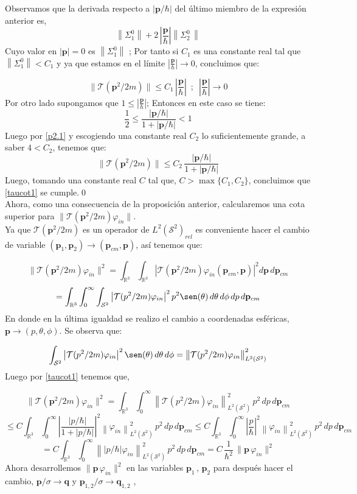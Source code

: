 \documentclass[12pt]{book}
\numberwithin{equation}{chapter}
\def\v{\mathbf}
\def\n{\noindent}
\def\R{\mathbb{R}}
\def\S{\mathcal{S}}
\def\T{\mathcal{T}}
\def\vp{\varphi}
\def\P{\mathbf{p}}
\begin{document}
\n Observamos que la derivada respecto a $|\P/\hbar|$ del \'ultimo miembro de la expresi\'on anterior es,
$$ \left\|  \Sigma_{1}^{0} \right\|+ 2 \, \left| \frac{\P}{\hbar} \right| \left\|   \Sigma_{2}^{0}  \, \right\| $$
Cuyo valor en $|\P|=0$ es $\left\|  \Sigma_{1}^{0} \right\|$ ; Por tanto si $C_{1}$ es una constante real tal que $\left\|  \Sigma_{1}^{0} \right\| < C_{1}$ y ya que estamos en el l\'imite $\left| \frac{\P}{\hbar} \right| \rightarrow 0 $, concluimos que:

\begin{equation}
\| \T ( \P^{2}/2m ) \| \leq C_{1}\, \left| \frac{\P}{\hbar} \right| \,\,\,;\,\,\, \left| \frac{\P}{\hbar} \right| \rightarrow 0
\end{equation}
Por otro lado supongamos que $1 \leq \left| \frac{\P}{\hbar} \right|$; Entonces en este caso se tiene:
$$ \frac{1}{2} \leq \frac{ |\P/\hbar| }{1+|\P/\hbar|} < 1 $$
Luego por \eqref{p2.1} y escogiendo una constante real $C_{2}$ lo suficientemente grande, a saber $4<C_{2}$, tenemos que:
$$ \| \T(\P^{2}/2m) \| \leq C_{2}\, \frac{ |\P/\hbar| }{1+|\P/\hbar|}  $$
Luego, tomando una constante real $C$ tal que, $C > \max \{ C_{1},C_{2} \}$, concluimos que \eqref{taucot1} se cumple.\qed \\

Ahora, como una consecuencia de la proposici\'on anterior, calcularemos una cota superior para $\| \T(\P^{2}/2m) \vp_{in}  \|$.\\

\n Ya que $ \T(\P^{2}/2m) $ es un operador de $L^{2}(\S^{2})_{rel}$ es conveniente hacer el cambio de variable $ ( \P_{1},\P_{2} ) \rightarrow ( \P_{cm},\P ) $, as\'i tenemos que:

$$ \| \T(\P^{2}/2m) \vp_{in}  \|^{2} = \int_{\R^{3}} \int_{\R^{3}} \left|\T(\P^{2}/2m) \vp_{in}( \P_{cm},\P ) \right|^{2} d\P\, d\P_{cm}$$
$$ = \int_{\R^{3}} \int_{0}^{\infty} \int_{\S^{2}} \left|\T(p^{2}/2m) \vp_{in} \right|^{2} p^{2} \sen (\theta) \, d\theta \, d \phi \, dp \, d\P_{cm} $$
En donde en la \'ultima igualdad se realizo el cambio a coordenadas esf\'ericas, $ \P \rightarrow (p,\theta , \phi ) $. Se observa que:

$$ \int_{\S^{2}} \left|\T(p^{2}/2m) \vp_{in} \right|^{2} \sen (\theta) \, d\theta \, d \phi = \left\| \T(p^{2}/2m) \vp_{in}  \right\|_{L^{2}(\S^{2})}^{2} $$
Luego por \eqref{taucot1} tenemos que,

$$ \| \T(\P^{2}/2m) \vp_{in}  \|^{2} = \int_{\R^{3}} \int_{0}^{\infty}  \left\| \T(p^{2}/2m) \vp_{in}  \right\|_{L^{2}(\S^{2})}^{2}\, p^{2} \, dp \, d\P_{cm} $$
$$\leq C \int_{\R^{3}} \int_{0}^{\infty} \left| \frac{ |p/\hbar| }{1+|p/\hbar|} \right|^{2}\left\| \vp_{in} \right\|_{L^{2}(\S^{2})}^{2}\, p^{2} \, dp \, d\P_{cm}
\leq C \int_{\R^{3}} \int_{0}^{\infty} \left| \frac{p}{\hbar} \right|^{2}\left\| \vp_{in} \right\|_{L^{2}(\S^{2})}^{2}\, p^{2} \, dp \, d\P_{cm} $$
$$= C \int_{\R^{3}} \int_{0}^{\infty} \left\| \left| p/\hbar \right| \vp_{in} \right\|_{L^{2}(\S^{2})}^{2}\, p^{2} \, dp \, d\P_{cm} = C \, \frac{1}{\hbar^{2}}\, \| \P \, \vp_{in}  \|^{2} $$
Ahora desarrollemos $\| \P \, \vp_{in}  \|^{2}$ en las variables $\P_{1}\,,\, \P_{2}$ para despu\'es hacer el cambio, $ \P/\sigma \rightarrow \v{q} $ y $ \P_{1,2}/\sigma \rightarrow \v{q}_{1,2} $ ,
\end{document}
